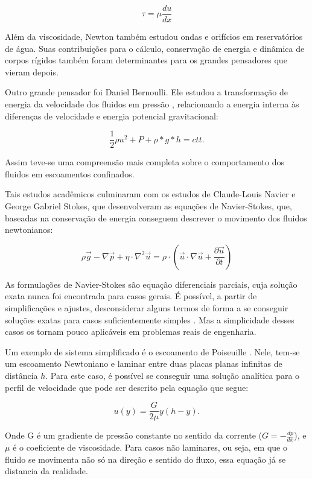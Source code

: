 \begin{equation}
    \tau = \mu \frac{d u}{d x}
\end{equation}

Além da viscosidade, Newton também estudou ondas e orifícios em reservatórios de água. Suas contribuições para o cálculo, conservação de energia e dinâmica de corpos rígidos também foram determinantes para os grandes pensadores que vieram depois.

Outro grande pensador foi Daniel Bernoulli. Ele estudou a transformação de energia da velocidade dos fluidos em pressão \cite{1570009750104671360}, relacionando a energia interna às diferenças de velocidade e energia potencial gravitacional:

\begin{equation}
    \frac{1}{2}\rho u^2 + P + \rho * g * h = ctt.
\end{equation}

Assim teve-se uma compreensão mais completa sobre o comportamento dos fluidos em escoamentos confinados.

Tais estudos acadêmicos culminaram com os estudos de  Claude-Louis Navier e George Gabriel Stokes, que desenvolveram as equações de Navier-Stokes, que, baseadas na conservação de energia conseguem descrever o movimento dos fluidos newtonianos:

\begin{equation}
\rho \vec{g}-\nabla \vec{p}+\eta \cdot \nabla^{2} \vec{u}=\rho \cdot\left(\vec{u} \cdot \nabla \vec{u}+\frac{\partial \vec{u}}{\partial t}\right)
\end{equation}

As formulações de Navier-Stokes são equação diferenciais parciais, cuja solução exata nunca foi encontrada para casos gerais. É possível, a partir de simplificações e ajustes, desconsiderar alguns termos de forma a se conseguir soluções exatas para casos suficientemente simples \cite{Cengel}. Mas a simplicidade desses casos os tornam pouco aplicáveis em problemas reais de engenharia.

Um exemplo de sistema simplificado é o escoamento de Poiseuille \cite{Poiseuille}. Nele, tem-se um escoamento Newtoniano e laminar entre duas placas planas infinitas de distância $h$. Para este caso, é possível se conseguir uma solução analítica para o perfil de velocidade que pode ser descrito pela equação que segue:

\begin{equation}
  u(y) = \frac{G}{2\mu}y (h - y).
\end{equation}

Onde G é um gradiente de pressão constante no sentido da corrente ($G = -\frac{dp}{dx}$), e $\mu$ é o coeficiente de viscosidade. Para casos não laminares, ou seja, em que o fluido se movimenta não só na direção e sentido do fluxo, essa equação já se distancia da realidade.
